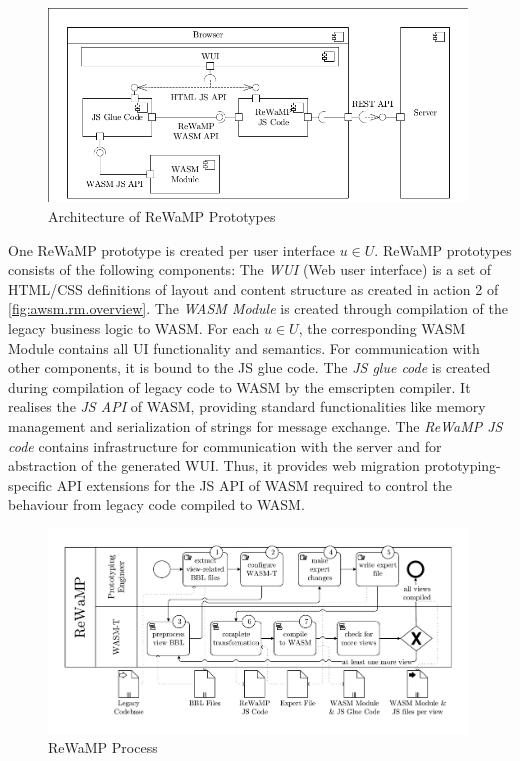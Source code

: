 \begin{figure}
\hypertarget{fig:awsm.rm.rewamp.architecture}{%
\centering
\includegraphics[width=0.99\textwidth]{../figures/rewamp/rewamp-prototype-architecture.pdf}
\caption{Architecture of ReWaMP Prototypes \autocite[adapted from][]{Heil2018ReWaMP}}\label{fig:awsm.rm.rewamp.architecture}
}
\end{figure}

One ReWaMP prototype is created per user interface \(u \in U\).
ReWaMP prototypes \autocite{Heil2018ReWaMP} consists of the following components: The \emph{WUI} (Web user interface) is a set of HTML/CSS definitions of layout and content structure as created in action 2 of \cref{fig:awsm.rm.overview}.
The \emph{WASM Module} is created through compilation of the legacy business logic to WASM.
For each \(u \in U\), the corresponding WASM Module contains all UI functionality and semantics.
For communication with other components, it is bound to the JS glue code.
The \emph{JS glue code} is created during compilation of legacy code to WASM by the emscripten compiler.
It realises the \emph{JS API} of WASM, providing standard functionalities like memory management and serialization of strings for message exchange.
The \emph{ReWaMP JS code} contains infrastructure for communication with the server and for abstraction of the generated WUI.
Thus, it provides web migration prototyping-specific API extensions for the JS API of WASM required to control the behaviour from legacy code compiled to WASM.

\begin{figure}
\hypertarget{fig:awsm.rm.rewamp.process}{%
\centering
\includegraphics[width=0.99\textwidth]{../figures/rewamp/BPMN_RWMP.pdf}
\caption{ReWaMP Process \autocite[adapted from][]{Heil2018ReWaMP}}\label{fig:awsm.rm.rewamp.process}
}
\end{figure}

